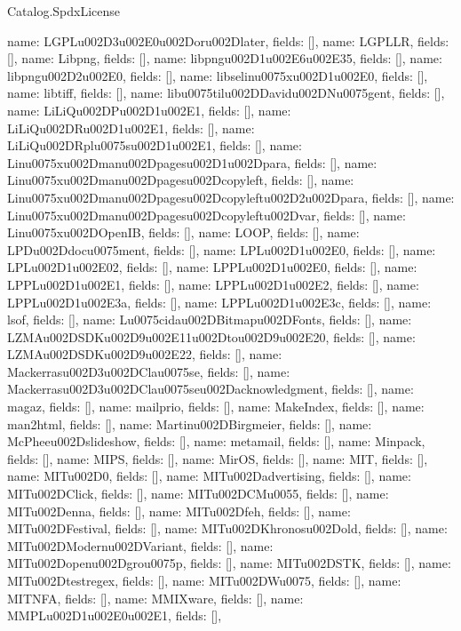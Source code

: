 \begin{lexlean}{Catalog.SpdxLicense}
\begin{semanticmodule}
{    {name: LGPLu002D3u002E0u002Doru002Dlater, fields: []},
    {name: LGPLLR, fields: []},
    {name: Libpng, fields: []},
    {name: libpngu002D1u002E6u002E35, fields: []},
    {name: libpngu002D2u002E0, fields: []},
    {name: libselinu0075xu002D1u002E0, fields: []},
    {name: libtiff, fields: []},
    {name: libu0075tilu002DDavidu002DNu0075gent, fields: []},
    {name: LiLiQu002DPu002D1u002E1, fields: []},
    {name: LiLiQu002DRu002D1u002E1, fields: []},
    {name: LiLiQu002DRplu0075su002D1u002E1, fields: []},
    {name: Linu0075xu002Dmanu002Dpagesu002D1u002Dpara, fields: []},
    {name: Linu0075xu002Dmanu002Dpagesu002Dcopyleft, fields: []},
    {name: Linu0075xu002Dmanu002Dpagesu002Dcopyleftu002D2u002Dpara, fields: []},
    {name: Linu0075xu002Dmanu002Dpagesu002Dcopyleftu002Dvar, fields: []},
    {name: Linu0075xu002DOpenIB, fields: []},
    {name: LOOP, fields: []},
    {name: LPDu002Ddocu0075ment, fields: []},
    {name: LPLu002D1u002E0, fields: []},
    {name: LPLu002D1u002E02, fields: []},
    {name: LPPLu002D1u002E0, fields: []},
    {name: LPPLu002D1u002E1, fields: []},
    {name: LPPLu002D1u002E2, fields: []},
    {name: LPPLu002D1u002E3a, fields: []},
    {name: LPPLu002D1u002E3c, fields: []},
    {name: lsof, fields: []},
    {name: Lu0075cidau002DBitmapu002DFonts, fields: []},
    {name: LZMAu002DSDKu002D9u002E11u002Dtou002D9u002E20, fields: []},
    {name: LZMAu002DSDKu002D9u002E22, fields: []},
    {name: Mackerrasu002D3u002DClau0075se, fields: []},
    {name: Mackerrasu002D3u002DClau0075seu002Dacknowledgment, fields: []},
    {name: magaz, fields: []},
    {name: mailprio, fields: []},
    {name: MakeIndex, fields: []},
    {name: man2html, fields: []},
    {name: Martinu002DBirgmeier, fields: []},
    {name: McPheeu002Dslideshow, fields: []},
    {name: metamail, fields: []},
    {name: Minpack, fields: []},
    {name: MIPS, fields: []},
    {name: MirOS, fields: []},
    {name: MIT, fields: []},
    {name: MITu002D0, fields: []},
    {name: MITu002Dadvertising, fields: []},
    {name: MITu002DClick, fields: []},
    {name: MITu002DCMu0055, fields: []},
    {name: MITu002Denna, fields: []},
    {name: MITu002Dfeh, fields: []},
    {name: MITu002DFestival, fields: []},
    {name: MITu002DKhronosu002Dold, fields: []},
    {name: MITu002DModernu002DVariant, fields: []},
    {name: MITu002Dopenu002Dgrou0075p, fields: []},
    {name: MITu002DSTK, fields: []},
    {name: MITu002Dtestregex, fields: []},
    {name: MITu002DWu0075, fields: []},
    {name: MITNFA, fields: []},
    {name: MMIXware, fields: []},
    {name: MMPLu002D1u002E0u002E1, fields: []},
}
\end{semanticmodule}
\end{lexlean}
